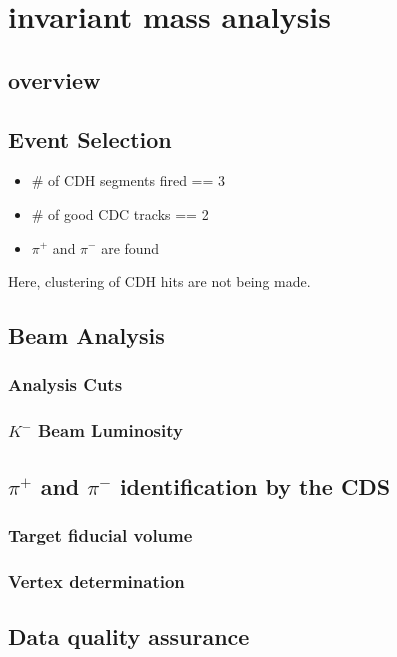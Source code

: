 \section{ \reaction invariant mass analysis}
\subsection{overview}


\subsection{Event Selection}
\begin{itemize}
\item \# of CDH segments fired == 3
\item \# of good CDC tracks == 2
\item $\pi^+$ and $\pi^-$ are found
\end{itemize}
Here, clustering of CDH hits are not being made.


\subsection{Beam Analysis}
\subsubsection{Analysis Cuts}

\subsubsection{$K^-$ Beam Luminosity}



\subsection{$\pi^{+}$ and $\pi^{-}$ identification by the CDS}


\subsubsection{Target fiducial volume}

\subsubsection{Vertex determination}


\subsection{Data quality assurance}


